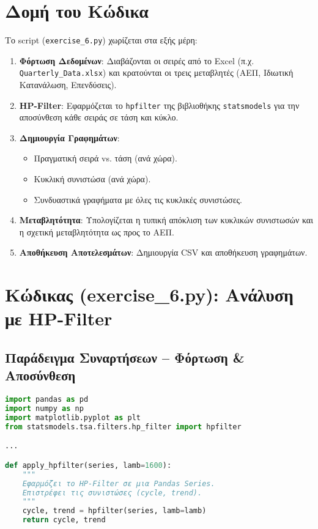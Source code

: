 \documentclass{book}
\begin{document}
\section{Δομή του Κώδικα}
Το script (\texttt{exercise\_6.py}) χωρίζεται στα εξής μέρη:
\begin{enumerate}
    \item \textbf{Φόρτωση Δεδομένων}: Διαβάζονται οι σειρές από το Excel (π.χ. \texttt{Quarterly\_Data.xlsx}) και κρατούνται οι τρεις μεταβλητές (ΑΕΠ, Ιδιωτική Κατανάλωση, Επενδύσεις).
    \item \textbf{HP-Filter}: Εφαρμόζεται το \texttt{hpfilter} της βιβλιοθήκης \texttt{statsmodels} για την αποσύνθεση κάθε σειράς σε τάση και κύκλο.
    \item \textbf{Δημιουργία Γραφημάτων}:
    \begin{itemize}
        \item Πραγματική σειρά vs. τάση (ανά χώρα).
        \item Κυκλική συνιστώσα (ανά χώρα).
        \item Συνδυαστικά γραφήματα με όλες τις κυκλικές συνιστώσες.
    \end{itemize}
    \item \textbf{Μεταβλητότητα}: Υπολογίζεται η τυπική απόκλιση των κυκλικών συνιστωσών και η σχετική μεταβλητότητα ως προς το ΑΕΠ.
    \item \textbf{Αποθήκευση Αποτελεσμάτων}: Δημιουργία CSV και αποθήκευση γραφημάτων.
\end{enumerate}

\section{ Κώδικας (exercise\_6.py): Ανάλυση με HP-Filter}
\subsection{Παράδειγμα Συναρτήσεων – Φόρτωση \& Αποσύνθεση}
\begin{tcolorbox}[colback=white,colframe=black,title=Υπόδειγμα Φόρτωσης και Εφαρμογής HP-Filter (Pseudo-code)]
\begin{lstlisting}[language=Python]
import pandas as pd
import numpy as np
import matplotlib.pyplot as plt
from statsmodels.tsa.filters.hp_filter import hpfilter

...

def apply_hpfilter(series, lamb=1600):
    """
    Εφαρμόζει το HP-Filter σε μια Pandas Series.
    Επιστρέφει τις συνιστώσες (cycle, trend).
    """
    cycle, trend = hpfilter(series, lamb=lamb)
    return cycle, trend
\end{lstlisting}
\end{tcolorbox}
\end{document}
